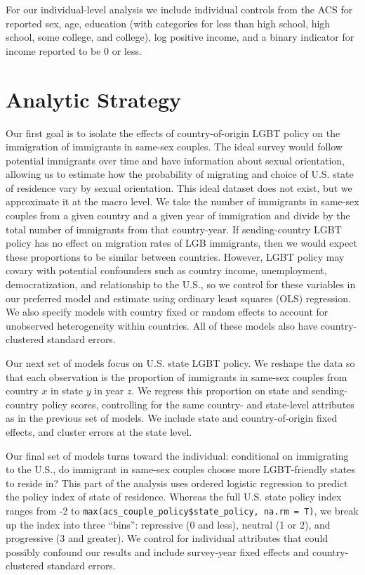 \documentclass[11pt,]{article}
\begin{document}
For our individual-level analysis we include individual controls from the ACS for reported sex, age, education (with categories for less than high school, high school, some college, and college), log positive income, and a binary indicator for income reported to be 0 or less.

\hypertarget{analytic-strategy}{%
\section{Analytic Strategy}\label{analytic-strategy}}

Our first goal is to isolate the effects of country-of-origin LGBT policy on the immigration of immigrants in same-sex couples. The ideal survey would follow potential immigrants over time and have information about sexual orientation, allowing us to estimate how the probability of migrating and choice of U.S. state of residence vary by sexual orientation. This ideal dataset does not exist, but we approximate it at the macro level. We take the number of immigrants in same-sex couples from a given country and a given year of immigration and divide by the total number of immigrants from that country-year. If sending-country LGBT policy has no effect on migration rates of LGB immigrants, then we would expect these proportions to be similar between countries. However, LGBT policy may covary with potential confounders such as country income, unemployment, democratization, and relationship to the U.S., so we control for these variables in our preferred model and estimate using ordinary least squares (OLS) regression. We also specify models with country fixed or random effects to account for unobserved heterogeneity within countries. All of these models also have country-clustered standard errors.

Our next set of models focus on U.S. state LGBT policy. We reshape the data so that each observation is the proportion of immigrants in same-sex couples from country \(x\) in state \(y\) in year \(z\). We regress this proportion on state and sending-country policy scores, controlling for the same country- and state-level attributes as in the previous set of models. We include state and country-of-origin fixed effects, and cluster errors at the state level.

Our final set of models turns toward the individual: conditional on immigrating to the U.S., do immigrant in same-sex couples choose more LGBT-friendly states to reside in? This part of the analysis uses ordered logistic regression to predict the policy index of state of residence. Whereas the full U.S. state policy index ranges from -2 to \texttt{max(acs\_couple\_policy\$state\_policy,\ na.rm\ =\ T)}, we break up the index into three ``bins'': repressive (0 and less), neutral (1 or 2), and progressive (3 and greater). We control for individual attributes that could possibly confound our results and include survey-year fixed effects and country-clustered standard errors.
\end{document}
